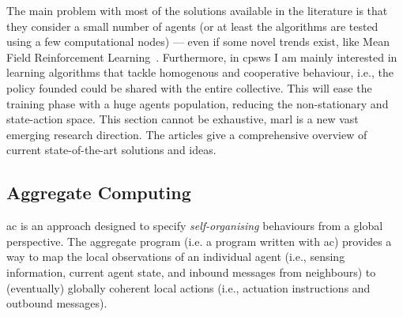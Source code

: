 \documentclass[11pt]{article}
\begin{document}
The main problem with most of the solutions available in the literature is that they consider a small number of agents (or at least the algorithms are tested using a few computational nodes) --- even if some novel trends exist, like Mean Field Reinforcement Learning~\cite{DBLP:journals/corr/abs-2108-02731}.
%
Furthermore, in \acp{cpsw} I am mainly interested in learning algorithms that tackle homogenous and cooperative behaviour, i.e., the policy founded could be shared with the entire collective. 
%
This will ease the training phase with a huge agents population, reducing the non-stationary and state-action space.
%
This section cannot be exhaustive, \ac{marl} is a new vast emerging research direction. 
%
The articles \cite{DBLP:journals/aamas/Hernandez-LealK19, DBLP:journals/corr/abs-1911-10635, DBLP:journals/corr/abs-1908-03963} give a comprehensive overview of current state-of-the-art solutions and ideas.
\subsection{Aggregate Computing}

\ac{ac} is an approach designed to specify \emph{self-organising} behaviours from a global perspective.
%
The aggregate program (i.e. a program written with \ac{ac}) provides a way to map the local observations of an individual agent (i.e., sensing information, current agent state, and inbound messages from neighbours) to (eventually) globally coherent local actions
 (i.e., actuation instructions and outbound messages).
%
\end{document}
